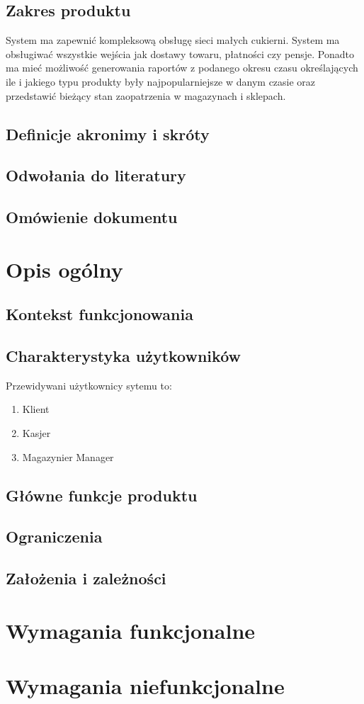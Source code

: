 \documentclass[16pt,a4paper]{article}
\begin{document}
\subsection{Zakres produktu}
System ma zapewnić kompleksową obsługę sieci małych cukierni. System ma obsługiwać wszystkie wejścia jak dostawy towaru, płatności czy pensje. Ponadto ma mieć możliwość generowania raportów z podanego okresu czasu określających ile i jakiego typu produkty były najpopularniejsze w danym czasie oraz przedstawić bieżący stan zaopatrzenia w magazynach i sklepach. 
\subsection{Definicje akronimy i skróty}
\subsection{Odwołania do literatury}
\subsection{Omówienie dokumentu}
\section{Opis ogólny}
\subsection{Kontekst funkcjonowania}
\subsection{Charakterystyka użytkowników}
Przewidywani użytkownicy sytemu to:
\begin{enumerate}
\item Klient
\item Kasjer
\item Magazynier
\itrm Manager 
\end{enumerate}
\subsection{Główne funkcje produktu}
\subsection{Ograniczenia}
\subsection{Założenia i zależności}
\section{Wymagania funkcjonalne}
\section{Wymagania niefunkcjonalne}
\end{document}

